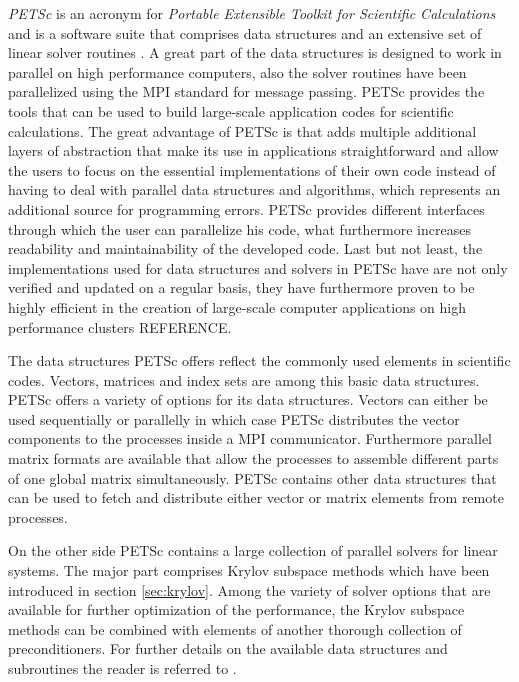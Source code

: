 \emph{PETSc} is an acronym for \emph{Portable Extensible Toolkit for Scientific Calculations} and is a software suite that comprises data structures and an extensive set of linear solver routines \cite{petsc-web-page,petsc-efficient}. A great part of the data structures is designed to work in parallel on high performance computers, also the solver routines have been parallelized using the MPI standard for message passing. PETSc provides the tools that can be used to build large-scale application codes for scientific calculations. The great advantage of PETSc is that adds multiple additional layers of abstraction that make its use in applications straightforward and allow the users to focus on the essential implementations of their own code instead of having to deal with parallel data structures and algorithms, which represents an additional source for programming errors. PETSc provides different interfaces through which the user can parallelize his code, what furthermore increases readability and maintainability of the developed code. Last but not least, the implementations used for data structures and solvers in PETSc have are not only verified and updated on a regular basis, they have furthermore proven to be highly efficient in the creation of large-scale computer applications on high performance clusters REFERENCE.

The data structures PETSc offers reflect the commonly used elements in scientific codes. Vectors, matrices and index sets are among this basic data structures. PETSc offers a variety of options for its data structures. Vectors can either be used sequentially or parallelly in which case PETSc distributes the vector components to the processes inside a MPI communicator. Furthermore parallel matrix formats are available that allow the processes to assemble different parts of one global matrix simultaneously. PETSc contains other data structures that can be used to fetch and distribute either vector or matrix elements from remote processes.

On the other side PETSc contains a large collection of parallel solvers for linear systems. The major part comprises Krylov subspace methods which have been introduced in section \ref{sec:krylov}. Among the variety of solver options that are available for further optimization of the performance, the Krylov subspace methods can be combined with elements of another thorough collection of preconditioners. For further details on the available data structures and subroutines the reader is referred to \cite{petsc-user-ref,petsc-web-page}.

